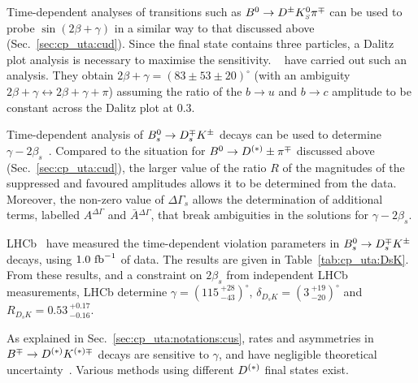 \label{sec:cp_uta:cus-td}


Time-dependent analyses of transitions such as $B^0 \to D^\pm K^0_{\scriptscriptstyle S} \pi^\mp$ can
be used to probe $\sin(2\beta+\gamma)$ in a similar way to that discussed
above (Sec.~\ref{sec:cp_uta:cud}). Since the final state contains three
particles, a Dalitz plot analysis is necessary to maximise the
sensitivity. \babar~\cite{Aubert:2007qe} have carried out such an
analysis. They obtain $2\beta+\gamma = \left( 83 \pm 53 \pm 20 \right)^\circ$
(with an ambiguity $2\beta+\gamma \leftrightarrow 2\beta+\gamma+\pi$) assuming
the ratio of the $b \to u$ and $b \to c$ amplitude to be constant across the
Dalitz plot at 0.3.


Time-dependent analysis of $B^0_s \to D_s^\mp K^\pm$ decays can be used to determine $\gamma-2\beta_s$~\cite{Dunietz:1987bv,Aleksan:1991nh,Fleischer:2003yb}.
Compared to the situation for $B^0 \to D^{(*)}\pm \pi^\mp$ discussed above (Sec.~\ref{sec:cp_uta:cud}), the larger value of the ratio $R$ of the magnitudes of the suppressed and favoured amplitudes allows it to be determined from the data.  
Moreover, the non-zero value of $\Delta \Gamma_s$ allows the determination of additional terms, labelled $A^{\Delta\Gamma}$ and $\bar{A}{}^{\Delta\Gamma}$, that break ambiguities in the solutions for $\gamma-2\beta_s$.

LHCb~\cite{Aaij:2014fba} have measured the time-dependent \CP violation parameters in $B^0_s \to D_s^\mp K^\pm$ decays, using $1.0 \ {\rm fb}^{-1}$ of data.  
The results are given in Table~\ref{tab:cp_uta:DsK}.
From these results, and a constraint on $2\beta_s$ from independent LHCb measurements, LHCb determine $\gamma = (115 \,^{+28}_{-43})^\circ$, $\delta_{D_sK} = (3 \,^{+19}_{-20})^\circ$ and $R_{D_sK} = 0.53 \,^{+0.17}_{-0.16}$. 



\clearpage
{}
\label{sec:cp_uta:cus}

As explained in Sec.~\ref{sec:cp_uta:notations:cus},
rates and asymmetries in $B^\mp \to D^{(*)} K^{(*)\mp}$ decays
are sensitive to $\gamma$, and have negligible theoretical uncertainty~\cite{Brod:2013sga}.
Various methods using different $D^{(*)}$ final states exist.

